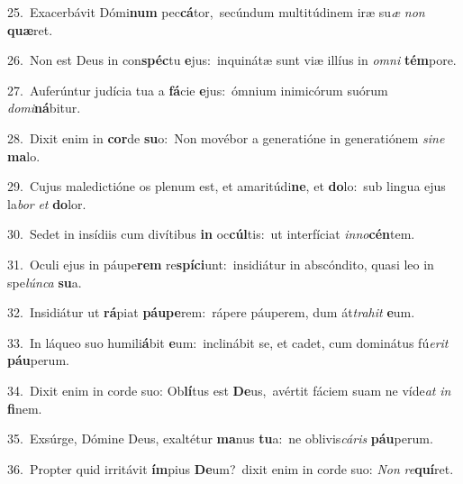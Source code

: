 {\numbfont\textcolor{\numbcolor}{25.}}~Exacerbávit Dómi\textbf{num} pec\-\textbf{cá}\-tor,~\star secúndum multitúdinem iræ su\textit{æ} \textit{non} \textbf{quæ}\-ret.\par
{\numbfont\textcolor{\numbcolor}{26.}}~Non est Deus in con\-\textbf{spéc}\-tu \textbf{e}\-jus:~\star inquinátæ sunt viæ illíus in \textit{om}\-\textit{ni} \textbf{tém}\-pore.\par
{\numbfont\textcolor{\numbcolor}{27.}}~Auferúntur judícia tua a \textbf{fá}\-cie \textbf{e}\-jus:~\star ómnium inimicórum suórum \textit{do}\-\textit{mi}\textbf{ná}bitur.\par
{\numbfont\textcolor{\numbcolor}{28.}}~Dixit enim in \textbf{cor}\-de \textbf{su}\-o:~\star Non movébor a generatióne in generatiónem \textit{si}\-\textit{ne} \textbf{ma}\-lo.\par
{\numbfont\textcolor{\numbcolor}{29.}}~Cujus maledictióne os plenum est, et amaritúdi\-\textbf{ne}\-, et \textbf{do}\-lo:~\star sub lingua ejus la\textit{bor} \textit{et} \textbf{do}\-lor.\par
{\numbfont\textcolor{\numbcolor}{30.}}~Sedet in insídiis cum divítibus \textbf{in} oc\-\textbf{cúl}\-tis:~\star ut interfíciat \textit{in}\-\textit{no}\textbf{cén}tem.\par
{\numbfont\textcolor{\numbcolor}{31.}}~Oculi ejus in páupe\textbf{rem} re\-\textbf{spí}\-\textbf{ci}unt:~\star insidiátur in abscóndito, quasi leo in spe\-\textit{lún}\-\textit{ca} \textbf{su}\-a.\par
{\numbfont\textcolor{\numbcolor}{32.}}~Insidiátur ut \textbf{rá}\-piat \textbf{páu}\-\textbf{pe}rem:~\star rápere páuperem, dum át\-\textit{tra}\-\textit{hit} \textbf{e}\-um.\par
{\numbfont\textcolor{\numbcolor}{33.}}~In láqueo suo humili\-\textbf{á}\-bit \textbf{e}\-um:~\star inclinábit se, et cadet, cum dominátus fú\-\textit{e}\-\textit{rit} \textbf{páu}\-perum.\par
{\numbfont\textcolor{\numbcolor}{34.}}~Dixit enim in corde suo: Ob\-\textbf{lí}\-tus est \textbf{De}\-us,~\star avértit fáciem suam ne víde\textit{at} \textit{in} \textbf{fi}\-nem.\par
{\numbfont\textcolor{\numbcolor}{35.}}~Exsúrge, Dómine Deus, exaltétur \textbf{ma}\-nus \textbf{tu}\-a:~\star ne oblivis\-\textit{cá}\-\textit{ris} \textbf{páu}\-perum.\par
{\numbfont\textcolor{\numbcolor}{36.}}~Propter quid irritávit \textbf{ím}\-pius \textbf{De}\-um?~\star dixit enim in corde suo: \textit{Non} \textit{re}\-\textbf{quí}ret.\par
